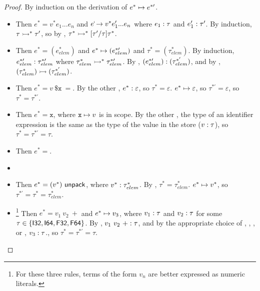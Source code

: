 \documentclass{article}
\begin{document}
\begin{proof}
By induction on the derivation of $e^* \mapsto e^{*\prime}$.
\begin{itemize}
    \item {}
        Then $e^* = v^* e_1 ... e_n$ and $e^ \step v^* e_1' ... e_n$ where $e_1 : \tau$ and $e_1' : \tau'$.
        By induction, $\tau \rightarrowtail^* \tau'$, so by , $\tau^* \rightarrowtail^* [\tau' / \tau]\tau^*$.
    
    \item {}
        Then $e^* = (e_{elem}^*)$ and $e^* \mapsto (e_{elem}^{*\prime})$ and $\tau^* = (\tau_{elem}^*)$.
        By induction, $e_{elem}^{*\prime} : \tau_{elem}^{*\prime}$ where $\tau_{elem}^* \rightarrowtail^* \tau_{elem}^{*\prime}$. By , $(e_{elem}^{*\prime}) : (\tau_{elem}^{*'})$, and by , $(\tau_{elem}^*) \rightarrowtail (\tau_{elem}^{*'})$.
        
    \item {}
        Then $e^* = v ~ \texttt{\$x} ~ =$. By the other , $e^* : \varepsilon$, so $\tau^* = \varepsilon$. $e^* \mapsto \varepsilon$, so $\tau^{*\prime} = \varepsilon$, so $\tau^* = \tau^{*\prime}$.

    \item {}
        Then $e^* = \texttt{x}$, where $\texttt{x} \mapsto v$ is in scope. By the other , the type of an identifier expression is the same as the type of the value in the store ($v : \tau$), so $\tau^* = \tau^{*\prime} = \tau$.
    
    \item {}
        Then $e^* = $.
    
    \item {}
    
    \item {}
        Then $e^* = (v^*) ~ \mathsf{unpack}$, where $v^* : \tau_{elem}^*$.
        By , $\tau^* = \tau_{elem}^*$. $e^* \mapsto v^*$, so $\tau^{*\prime} = \tau^* = \tau_{elem}^*$.
    
    \item {} \footnote{For these three rules, terms of the form $v_n$ are better expressed as numeric literals.}
        Then $e^* = v_1~ v_2~ +$ and $e^* \mapsto v_3$, where $v_1 : \tau$ and $v_2 : \tau$ for some $\tau \in \{\mathsf{I32}, \mathsf{I64}, \mathsf{F32}, \mathsf{F64}\}$.
        By , $v_1~ v_2~ + : \tau$, and by the appropriate choice of , , , or , $v_3 : \tau$., so $\tau^* = \tau^{*\prime} = \tau$.
    

\end{itemize}
\end{proof}
\end{document}
